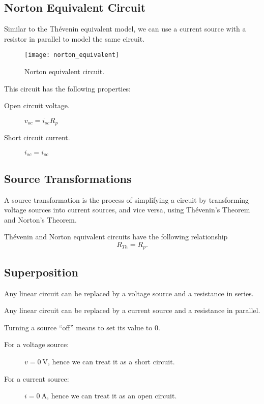 \documentclass{article}
\begin{document}
\subsection{Norton Equivalent Circuit}
\begin{definition}
    Similar to the Thévenin equivalent model, we can use a current source with
    a resistor in parallel to model the same circuit.
    \begin{figure}[H]
        \centering
        \texttt{[image: norton\_equivalent]}
        \caption{Norton equivalent circuit.}
    \end{figure}
    This circuit has the following properties:
    \begin{description}
        \item[Open circuit voltage.] $v_{oc} = i_{sc}R_{p}$
        \item[Short circuit current.] $i_{sc} = i_{sc}$
    \end{description}
\end{definition}
\subsection{Source Transformations}
A source transformation is the process of simplifying a circuit by transforming
voltage sources into current sources, and vice versa, using Thévenin's Theorem and Norton's
Theorem.
\begin{theorem}
    Thévenin and Norton equivalent circuits have the following relationship
    \begin{equation*}
        R_{Th} = R_{p}.
    \end{equation*}
\end{theorem}
\subsection{Superposition}
\begin{theorem}
    Any linear circuit can be replaced by a voltage source and a resistance in series.
\end{theorem}
\begin{theorem}
    Any linear circuit can be replaced by a current source and a resistance in parallel.
\end{theorem}
\begin{definition}
    Turning a source ``off'' means to set its value to 0.
    \begin{description}
        \item[For a voltage source:] $v = \SI{0}{\volt}$, hence we can treat it as a short circuit.
        \item[For a current source:] $i = \SI{0}{\ampere}$, hence we can treat it as an open circuit.
    \end{description}
\end{definition}
\end{document}
